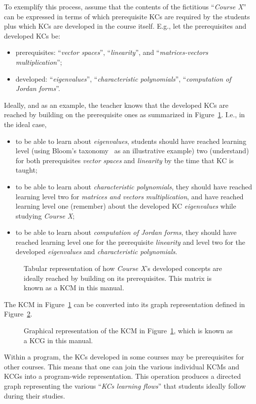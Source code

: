 \begin{example}
	To exemplify this process, assume that the contents of the
	fictitious ``\emph{Course X}'' can be expressed in terms of which
	prerequisite \acp{KC} are required by the students plus which
	\acp{KC} are developed in the course itself. E.g., let the
	prerequisites and developed \acp{KC} be:
	\begin{itemize}
		\item prerequisites: ``\emph{vector spaces}'',
			``\emph{linearity}'', and ``\emph{matrices-vectors
			multiplication}'';
		\item developed: ``\emph{eigenvalues}'',
			``\emph{characteristic polynomials}'',
			``\emph{computation of Jordan forms}''.
	\end{itemize}
	Ideally, and as an example, the teacher knows that the developed
	\acp{KC} are reached by building on the prerequisite ones as
	summarized in Figure~\ref{fig:KCM}. I.e., in the ideal case,
	\begin{itemize}
		\item to be able to learn about \emph{eigenvalues}, students
			should have reached learning level (using Bloom's
			taxonomy~\cite{bloom1956taxonomy} as an illustrative
			example) two (understand) for both prerequisites
			\emph{vector spaces} and \emph{linearity} by the
			time that \ac{KC} is taught;
		\item to be able to learn about \emph{characteristic
			polynomials}, they should have reached learning
			level two for \emph{matrices and vectors
			multiplication}, and have reached learning level one
			(remember) about the developed \ac{KC}
			\emph{eigenvalues} while studying \emph{Course X};
		\item to be able to learn about \emph{computation of Jordan
			forms}, they should have reached learning level one
			for the prerequisite \emph{linearity} and level two
			for the developed \emph{eigenvalues} and
			\emph{characteristic polynomials}.
	\end{itemize}
	\begin{figure}[!htbp]
		\centering
		
		\caption{Tabular representation of how \emph{Course X}'s
		developed concepts are ideally reached by building on its
		prerequisites. This matrix is known as a \acf{KCM} in this
		manual.}
		\label{fig:KCM}
	\end{figure}
	The \ac{KCM} in Figure~\ref{fig:KCM} can be converted into its graph
	representation defined in Figure~\ref{fig:KCG}.
	\begin{figure}[!htbp]
		\centering
		
		\caption{Graphical representation of the \acf{KCM} in
		Figure~\ref{fig:KCM}, which is known as a \acf{KCG} in this
		manual.}
		\label{fig:KCG}
	\end{figure}
	Within a program, the \acp{KC} developed in some courses may be
	prerequisites for other courses. This means that one can join the
	various individual \acp{KCM} and \acp{KCG} into a program-wide
	representation. This operation produces a directed graph
	representing the various ``\emph{\acp{KC} learning flows}'' that
	students ideally follow during their studies. 
\label{exa:KCM}
\end{example}

